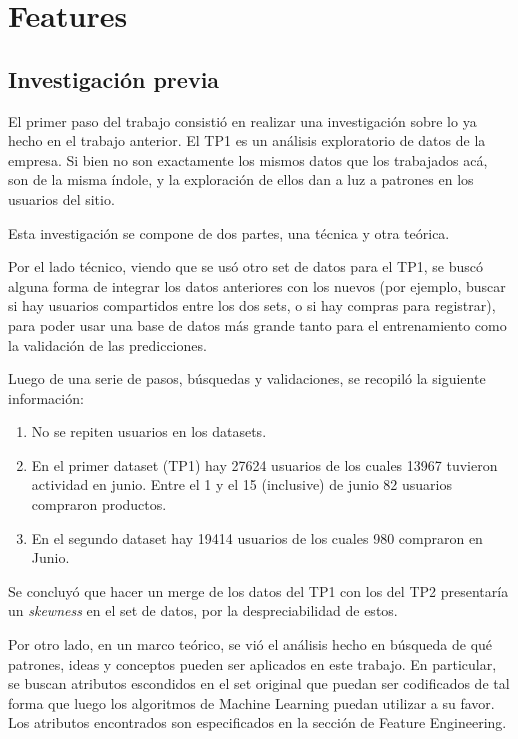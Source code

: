 \documentclass[a4paper]{article}
\begin{document}
\section{Features}
\subsection{Investigación previa}

El primer paso del trabajo consistió en realizar una investigación sobre lo ya hecho en el trabajo anterior. El TP1 es un análisis exploratorio de datos de la empresa. Si bien no son exactamente los mismos datos que los trabajados acá, son de la misma índole, y la exploración de ellos dan a luz a patrones en los usuarios del sitio.

Esta investigación se compone de dos partes, una técnica y otra teórica.

Por el lado técnico, viendo que se usó otro set de datos para el TP1, se buscó alguna forma de integrar los datos anteriores con los nuevos (por ejemplo, buscar si hay usuarios compartidos entre los dos sets, o si hay compras para registrar), para poder usar una base de datos más grande tanto para el entrenamiento como la validación de las predicciones. 

Luego de una serie de pasos, búsquedas y validaciones, se recopiló la siguiente información:
\begin{enumerate}
\item No se repiten usuarios en los datasets.
\item En el primer dataset (TP1) hay 27624 usuarios de los cuales 13967 tuvieron actividad en junio. Entre el 1 y el 15 (inclusive) de junio 82 usuarios compraron productos.
\item En el segundo dataset hay 19414 usuarios de los cuales 980 compraron en Junio.
\end{enumerate}

Se concluyó que hacer un merge de los datos del TP1 con los del TP2 presentaría un \textit{skewness} en el set de datos, por la despreciabilidad de estos.

Por otro lado, en un marco teórico, se vió el análisis hecho en búsqueda de qué patrones, ideas y conceptos pueden ser aplicados en este trabajo. En particular, se buscan atributos escondidos en el set original que puedan ser codificados de tal forma que luego los algoritmos de Machine Learning puedan utilizar a su favor. Los atributos encontrados son especificados en la sección de Feature Engineering.
\end{document}
